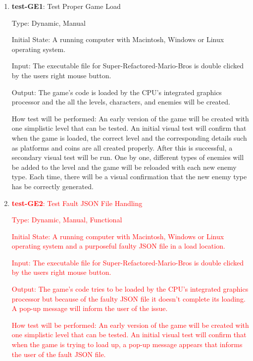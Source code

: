 \documentclass[12pt, titlepage]{article}
\begin{document}
\begin{enumerate}

\item{\textbf{test-GE1}: Test Proper Game Load\\}

Type: Dynamic, Manual

Initial State: A running computer with Macintosh, Windows or Linux operating system.

Input: The executable file for Super-Refactored-Mario-Bros is double clicked by the users right mouse button.

Output: The game's code is loaded by the CPU's integrated graphics processor and the all the levels, characters, and enemies will be created.

How test will be performed: An early version of the game will be created with one simplistic level that can be tested. An initial visual test will confirm that when the game is loaded, the correct level and the corresponding details such as platforms and coins are all created properly. After this is successful, a secondary visual test will be run. One by one, different types of enemies will be added to the level and the game will be reloaded with each new enemy type. Each time, there will be a visual confirmation that the new enemy type has be correctly generated.

\item{\textcolor{red}{\textbf{test-GE2}: Test Fault JSON File Handling\\}}

\textcolor{red}{Type: Dynamic, Manual, Functional}

\textcolor{red}{Initial State: A running computer with Macintosh, Windows or Linux operating system and a purposeful faulty JSON file in a load location.}

\textcolor{red}{Input: The executable file for Super-Refactored-Mario-Bros is double clicked by the users right mouse button.}

\textcolor{red}{Output: The game's code tries to be loaded by the CPU's integrated graphics processor but because of the faulty JSON file it doesn't complete its loading. A pop-up message will inform the user of the issue.}

\textcolor{red}{How test will be performed: An early version of the game will be created with one simplistic level that can be tested. An initial visual test will confirm that when the game is trying to load up, a pop-up message appears that informs the user of the fault JSON file.}

\end{enumerate}
\end{document}
